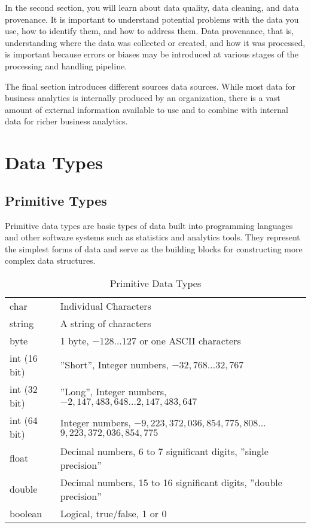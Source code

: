 In the second section, you will learn about data quality, data cleaning, and data provenance. It is important to understand potential problems with the data you use, how to identify them, and how to address them. Data provenance, that is, understanding where the data was collected or created, and how it was processed, is important because errors or biases may be introduced at various stages of the processing and handling pipeline.

The final section introduces different sources data sources. While most data for business analytics is internally produced by an organization, there is a vast amount of external information available to use and to combine with internal data for richer business analytics. 

\section{Data Types}

\subsection{Primitive Types}

Primitive data types are basic types of data built into programming languages and other software systems such as statistics and analytics tools. They represent the simplest forms of data and serve as the building blocks for constructing more complex data structures.

\begin{table}
\renewcommand{\arraystretch}{1.25}

\begin{tabularx}{\textwidth}{l|X} \hline
char 			& Individual Characters\\
string			& A string of characters\\
byte			& 1 byte, $-128 \ldots 127$ or one ASCII characters \\
int (16 bit)	& ''Short'', Integer numbers, $-32,768 \ldots 32,767$ \\ 
int (32 bit)	& ''Long'', Integer numbers, $-2,147,483,648 \ldots 2,147,483,647$ \\
int (64 bit)	& Integer numbers, $-9,223,372,036,854,775,808 \ldots$ $9,223,372,036,854,775$ \\
float			& Decimal numbers, 6 to 7 significant digits, ''single precision'' \\
double			& Decimal numbers, 15 to 16 significant digits, ''double precision'' \\
boolean			& Logical, true/false, 1 or 0 \\ \hline
\end{tabularx} 
\caption{Primitive Data Types}
\label{tab:primitive}
\end{table}


